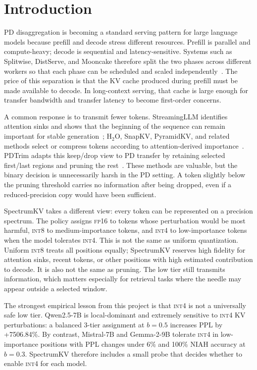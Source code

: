 \documentclass[11pt]{article}
\newcommand{\method}{SpectrumKV}
\newcommand{\niah}{NIAH}
\newcommand{\budget}{b}
\newcommand{\pct}{\%}
\newcommand{\fp}{\textsc{fp16}}
\newcommand{\intviii}{\textsc{int8}}
\newcommand{\intiv}{\textsc{int4}}
\theoremstyle{plain}
\theoremstyle{definition}
\begin{document}
\section{Introduction}
\label{sec:intro}

PD disaggregation is becoming a standard serving pattern for large language models because prefill and decode stress different resources.  Prefill is parallel and compute-heavy; decode is sequential and latency-sensitive.  Systems such as Splitwise, DistServe, and Mooncake therefore split the two phases across different workers so that each phase can be scheduled and scaled independently~\citep{splitwise,distserve,mooncake}.  The price of this separation is that the KV cache produced during prefill must be made available to decode.  In long-context serving, that cache is large enough for transfer bandwidth and transfer latency to become first-order concerns.

A common response is to transmit fewer tokens.  StreamingLLM identifies attention sinks and shows that the beginning of the sequence can remain important for stable generation~\citep{streamingllm}; H$_2$O, SnapKV, PyramidKV, and related methods select or compress tokens according to attention-derived importance~\citep{h2o,snapkv,pyramidkv,dynamickv}.  PDTrim adapts this keep/drop view to PD transfer by retaining selected first/last regions and pruning the rest~\citep{pdtrim}.  These methods are valuable, but the binary decision is unnecessarily harsh in the PD setting.  A token slightly below the pruning threshold carries no information after being dropped, even if a reduced-precision copy would have been sufficient.

\method{} takes a different view: every token can be represented on a precision spectrum.  The policy assigns \fp{} to tokens whose perturbation would be most harmful, \intviii{} to medium-importance tokens, and \intiv{} to low-importance tokens when the model tolerates \intiv{}.  This is not the same as uniform quantization.  Uniform \intviii{} treats all positions equally; \method{} reserves high fidelity for attention sinks, recent tokens, or other positions with high estimated contribution to decode.  It is also not the same as pruning.  The low tier still transmits information, which matters especially for retrieval tasks where the needle may appear outside a selected window.

The strongest empirical lesson from this project is that \intiv{} is not a universally safe low tier.  Qwen2.5-7B is local-dominant and extremely sensitive to \intiv{} KV perturbations: a balanced 3-tier assignment at $\budget=0.5$ increases PPL by +7506.84\pct{}.  By contrast, Mistral-7B and Gemma-2-9B tolerate \intiv{} in low-importance positions with PPL changes under 6\% and 100\% \niah{} accuracy at $\budget=0.3$.  \method{} therefore includes a small probe that decides whether to enable \intiv{} for each model.
\end{document}
